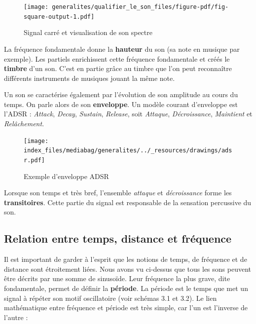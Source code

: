 \documentclass[
  letterpaper,
  DIV=11,
  numbers=noendperiod]{scrreprt}
\begin{document}
\begin{figure}

{\centering \texttt{[image: generalites/qualifier\_le\_son\_files/figure-pdf/fig-square-output-1.pdf]}

}

\caption{\label{fig-square}Signal carré et visualisation de son spectre}

\end{figure}

La fréquence fondamentale donne la \textbf{hauteur} du son (sa note en
musique par exemple). Les partiels enrichissent cette fréquence
fondamentale et créés le \textbf{timbre} d'un son. C'est en partie grâce
au timbre que l'on peut reconnaître différents instruments de musiques
jouant la même note.

Un son se caractérise également par l'évolution de son amplitude au
cours du temps. On parle alors de son \textbf{enveloppe}. Un modèle
courant d'enveloppe est l'ADSR : \emph{Attack}, \emph{Decay},
\emph{Sustain}, \emph{Release}, soit \emph{Attaque},
\emph{Décroissance}, \emph{Maintient} et \emph{Relâchement}.

\begin{figure}

{\centering \texttt{[image: index\_files/mediabag/generalites/../\_resources/drawings/adsr.pdf]}

}

\caption{\label{fig-adsr}Exemple d'enveloppe ADSR}

\end{figure}

Lorsque son temps et très bref, l'ensemble \emph{attaque} et
\emph{décroissance} forme les \textbf{transitoires}. Cette partie du
signal est responsable de la sensation percussive du son.

\hypertarget{relation-entre-temps-distance-et-fruxe9quence}{%
\subsection{Relation entre temps, distance et
fréquence}\label{relation-entre-temps-distance-et-fruxe9quence}}

Il est important de garder à l'esprit que les notions de temps, de
fréquence et de distance sont étroitement liées. Nous avons vu ci-dessus
que tous les sons peuvent être décrits par une somme de sinusoïde. Leur
fréquence la plus grave, dite fondamentale, permet de définir la
\textbf{période}. La période est le temps que met un signal à répéter
son motif oscillatoire (voir schémas 3.1 et 3.2). Le lien mathématique
entre fréquence et période est très simple, car l'un est l'inverse de
l'autre :
\end{document}

